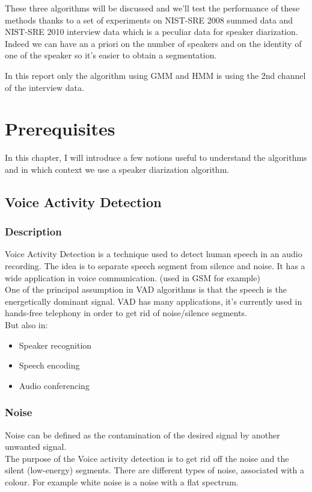 \documentclass{techrep} %
\begin{document}
These three algorithms will be discussed and we'll test the
performance of these methods thanks to a set of experiments on
NIST-SRE 2008 summed data and NIST-SRE 2010 interview data which is a
peculiar data for speaker diarization. Indeed we can have an a priori
on the number of speakers and on the identity of one of the speaker so
it's easier to obtain a segmentation.

In this report only the algorithm using GMM and HMM is using the 2nd
channel of the interview data.

\chapter{Prerequisites}

In this chapter, I will introduce a few notions useful to understand
the algorithms and in which context we use a speaker diarization
algorithm.

\section{Voice Activity Detection}

\subsection{Description}

Voice Activity Detection is a technique used to detect human speech in
an audio recording. The idea is to separate speech segment from
silence and noise. It has a wide application in voice
communication. (used in GSM for example)\\ One of the principal
assumption in VAD algorithms is that the speech is the energetically
dominant signal. VAD has many applications, it's currently used in
hands-free telephony in order to get rid of noise/silence
segments.\\ But also in:
\begin{itemize}
\item Speaker recognition
\item Speech encoding
\item Audio conferencing
\end{itemize}

\subsection{Noise}

Noise can be defined as the contamination of the desired signal by
another unwanted signal.\\ The purpose of the Voice activity detection
is to get rid off the noise and the silent (low-energy) segments.
There are different types of noise, associated with a colour. For
example white noise is a noise with a flat spectrum.
\end{document}
